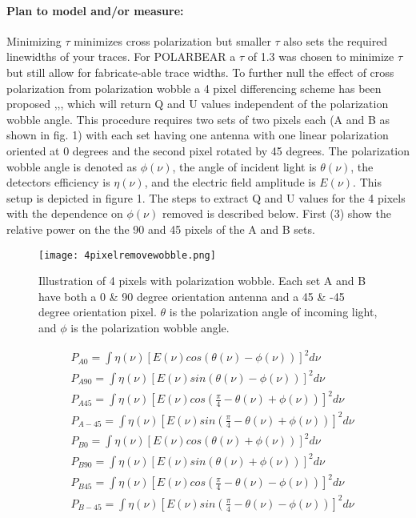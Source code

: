 \paragraph{Plan to model and/or measure:}
Minimizing $\tau$ minimizes cross polarization but smaller $\tau$ also sets the required linewidths of your traces. For POLARBEAR a $\tau$ of 1.3 was chosen to minimize $\tau$ but still allow for fabricate-able trace widths. To further null the effect of cross polarization from polarization wobble a 4 pixel differencing scheme has been proposed \cite{TokiThesis},\cite{TokiMemo1},\cite{TokiMemo2}, which will return Q and U values independent of the polarization wobble angle. This procedure requires two sets of two pixels each (A and B as shown in fig. 1) with each set having one antenna with one linear polarization oriented at 0 degrees and the second pixel rotated by 45 degrees. The polarization wobble angle is denoted as $\phi(\nu)$, the angle of incident light is $\theta(\nu)$, the detectors efficiency is $\eta(\nu)$, and the electric field amplitude is $E(\nu)$. This setup is depicted in figure 1. The steps to extract Q and U values for the 4 pixels with the dependence on $\phi(\nu)$ removed is described below. First (3) show the relative power on the the 90 and 45 pixels of the A and B sets.
\begin{figure}
\centering
\texttt{[image: 4pixelremovewobble.png]}
\caption{Illustration of 4 pixels with polarization wobble. Each set A and B have both a 0 \& 90 degree orientation antenna and a 45 \& -45 degree orientation pixel. $\theta$ is the polarization angle of incoming light, and $\phi$ is the polarization wobble angle.}
\label{4pixelwobbleremoval}
\end{figure}
\begin{equation}
\begin{split}
&P_{A0} = \int \eta(\nu)[E(\nu)cos(\theta(\nu)-\phi(\nu))]^2 d\nu \\
&P_{A90} = \int \eta(\nu)[E(\nu)sin(\theta(\nu)-\phi(\nu))]^2 d\nu \\
&P_{A45} = \int \eta(\nu)[E(\nu)cos(\frac{\pi}{4}-\theta(\nu)+\phi(\nu))]^2 d\nu \\
&P_{A-45} = \int \eta(\nu)[E(\nu)sin(\frac{\pi}{4}-\theta(\nu)+\phi(\nu))]^2 d\nu \\
&P_{B0} = \int \eta(\nu)[E(\nu)cos(\theta(\nu)+\phi(\nu))]^2 d\nu \\
&P_{B90} = \int \eta(\nu)[E(\nu)sin(\theta(\nu)+\phi(\nu))]^2 d\nu \\
&P_{B45} = \int \eta(\nu)[E(\nu)cos(\frac{\pi}{4}-\theta(\nu)-\phi(\nu))]^2 d\nu \\
&P_{B-45} = \int \eta(\nu)[E(\nu)sin(\frac{\pi}{4}-\theta(\nu)-\phi(\nu))]^2 d\nu
\end{split}
\end{equation}

